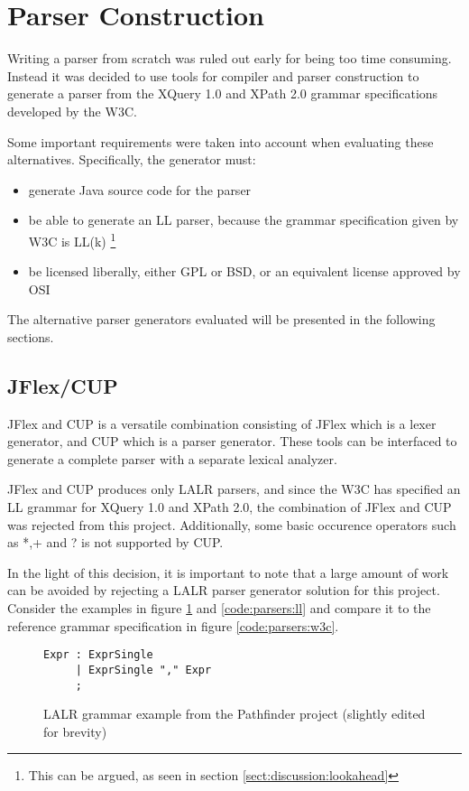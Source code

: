\section{Parser Construction}
\label{sect:method:alternatives}
Writing a parser from scratch was ruled out early for being too time consuming.
Instead it was decided to use tools for compiler and parser construction to
generate a parser from the XQuery 1.0 and XPath 2.0 grammar  
specifications\cite{w3c01} developed by the W3C.

Some important requirements were taken into account when evaluating these
alternatives. Specifically, the generator must:
\begin{itemize}
  \item generate Java source code for the parser
  \item be able to generate an LL parser, because the grammar  
  specification given by W3C is LL(k) \footnote{This can be argued, as seen in section \ref{sect:discussion:lookahead}}
  \item be licensed liberally, either GPL or BSD, or an equivalent license
  approved by OSI
\end{itemize}

The alternative parser generators evaluated will be presented in the following sections.

\subsection{JFlex/CUP}
JFlex and CUP is a versatile combination consisting of JFlex which is a lexer
generator, and CUP which is a parser generator. These tools can be interfaced to
generate a complete parser with a separate lexical analyzer.

JFlex and CUP produces only LALR parsers, and since the W3C has specified an
LL grammar for XQuery 1.0 and XPath 2.0, the combination of JFlex and CUP was
rejected from this project. Additionally, some basic occurence operators such as
*,+ and ? is not supported by CUP.

In the light of this decision, it is important to note that a large amount of
work can be avoided by rejecting a LALR parser generator solution for this
project. Consider the examples in figure \ref{code:parsers:lalr} and
\ref{code:parsers:ll} and compare it to the reference grammar specification in
figure \ref{code:parsers:w3c}.

\begin{figure}[h!]
\begin{Verbatim}
Expr : ExprSingle
     | ExprSingle "," Expr
     ;
\end{Verbatim}
\caption[LALR grammar example]{LALR grammar example from the Pathfinder project\cite{pathfinderHome} 
(slightly edited for brevity)}
\label{code:parsers:lalr}
\end{figure}

